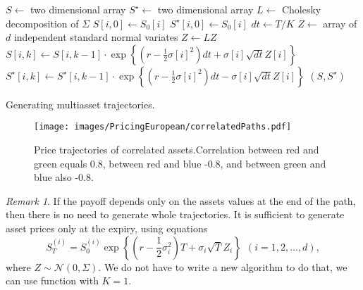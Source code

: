 \documentclass[a4paper,12pt, oneside]{book}
\theoremstyle{definition}
\theoremstyle{remark}
\newtheorem{remark}{Remark}[chapter]
\begin{document}
\begin{algorithm}
 \begin{algorithmic}[1]
  
  \State $S \gets$ two dimensional array 
  \State $S^\star \gets$ two dimensional array 
  \State $L \gets$ Cholesky decomposition of $\Sigma$ 
    \State $S[i,0] \gets S_0[i]$
    \State $S^\star[i,0] \gets S_0[i]$
  \EndFor
  \State $dt \gets T/K$
    \State $Z \gets$ array of $d$ independent standard normal variates
    \State $Z \gets LZ$ 
      \State $S[i, k] \gets S[i, k-1] \cdot \exp\left\{ (r - \frac{1}{2}\sigma[i]^2) dt + \sigma[i] \sqrt{dt} Z[i] \right\}$
      \State $S^\star[i, k] \gets S^\star[i, k-1] \cdot \exp\left\{ (r - \frac{1}{2}\sigma[i]^2) dt - \sigma[i] \sqrt{dt} Z[i] \right\}$
    \EndFor
  \EndFor
  \State \Return $(S, S^\star)$
  \EndFunction
 \end{algorithmic}
 \caption{Generating multiasset trajectories.}
 \label{alg:multi-tr}
\end{algorithm}

\begin{figure}
\centering
 \texttt{[image: images/PricingEuropean/correlatedPaths.pdf]}
\caption{Price trajectories of correlated assets.Correlation between red and green equals 0.8, between red and blue -0.8, and between green and blue also -0.8.}
\label{fig:corrPaths}
\end{figure}

\begin{remark}
 If the payoff depends only on the assets values at the end of the path, then there is no need to generate whole trajectories. It is sufficient to generate asset prices only at the expiry, using equations
 \[ S^{(i)}_T = S^{(i)}_0 \exp\left\{ (r - \frac{1}{2}\sigma_i^2)T + \sigma_i \sqrt{T} Z_i \right\} \ \ (i = 1,2,\ldots,d),\]
  where  $Z \sim \mathcal{N}(0, \Sigma)$. We do not have to write a new algorithm to do that, we can use function 
 with $K=1$.

\end{remark}
\end{document}

